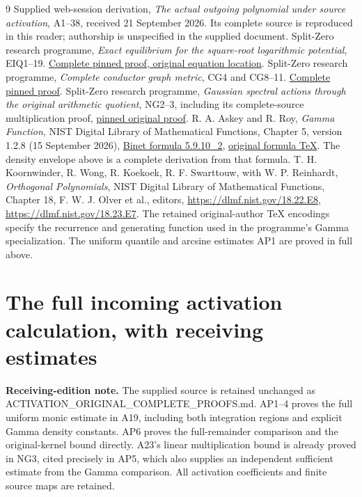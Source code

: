 \documentclass[11pt]{article}
\begin{document}
\begin{thebibliography}{9}
 Supplied web-session derivation,
\emph{The actual outgoing polynomial under source activation},
A1--38, received 21 September 2026. Its complete source is reproduced
in this reader; authorship is unspecified in the supplied document.
 Split-Zero research programme,
\emph{Exact equilibrium for the square-root logarithmic potential},
EIQ1--19.
\href{https://github.com/KokunoYumeto/zeta-function-research-reader/blob/5992ad50c0f2a06921f1fcaded7b4e38097c0739/workbenches/splitzero-tandem/continuations/20260920-original-kernel-mixed-determinants/providers/09_INPUT_CUMULATIVE_PROOFS.tex#L4381}{Complete pinned proof, original equation location}.
 Split-Zero research programme,
\emph{Complete conductor graph metric}, CG4 and CG8--11.
\href{https://github.com/KokunoYumeto/zeta-function-research-reader/blob/0fd693c844aad9117e30ec447c59864a28af10f3/workbenches/splitzero-tandem/continuations/20260921-native-spectral-real-pair/003/COMPLETE_CONDUCTOR_GRAPH_METRIC.tex}{Complete pinned proof}.
 Split-Zero research programme,
\emph{Gaussian spectral actions through the original arithmetic quotient},
NG2--3, including its complete-source multiplication proof,
\href{https://github.com/KokunoYumeto/zeta-function-research-reader/blob/5992ad50c0f2a06921f1fcaded7b4e38097c0739/workbenches/splitzero-tandem/continuations/20260920-original-kernel-mixed-determinants/providers/NATIVE_GAUSSIAN_TRANSFER.tex#L50}{pinned original proof}.
 R. A. Askey and R. Roy,
\emph{Gamma Function}, NIST Digital Library of Mathematical Functions,
Chapter 5, version 1.2.8 (15 September 2026),
\href{https://dlmf.nist.gov/5.9.E10_2}{Binet formula 5.9.10\_2},
\href{https://dlmf.nist.gov/5.9.E10_2.tex}{original formula TeX}.
The density envelope above is a complete derivation from that formula.
 T. H. Koornwinder, R. Wong, R. Koekoek,
R. F. Swarttouw, with W. P. Reinhardt,
\emph{Orthogonal Polynomials}, NIST Digital Library of Mathematical
Functions, Chapter 18, F. W. J. Olver et al., editors,
\url{https://dlmf.nist.gov/18.22.E8},
\url{https://dlmf.nist.gov/18.23.E7}.
The retained original-author TeX encodings specify the recurrence
and generating function used in the programme's Gamma specialization.
The uniform quantile and arcsine estimates AP1 are proved in full above.
\end{thebibliography}
\clearpage\part{The full incoming activation calculation, with receiving estimates}
\textbf{Receiving-edition note.} The supplied source is retained unchanged as ACTIVATION\_ORIGINAL\_COMPLETE\_PROOFS.md. AP1--4 proves the full uniform monic estimate in A19, including both integration regions and explicit Gamma density constants. AP6 proves the full-remainder comparison and the original-kernel bound directly. A23's linear multiplication bound is already proved in NG3, cited precisely in AP5, which also supplies an independent sufficient estimate from the Gamma comparison. All activation coefficients and finite source maps are retained.
\end{document}
